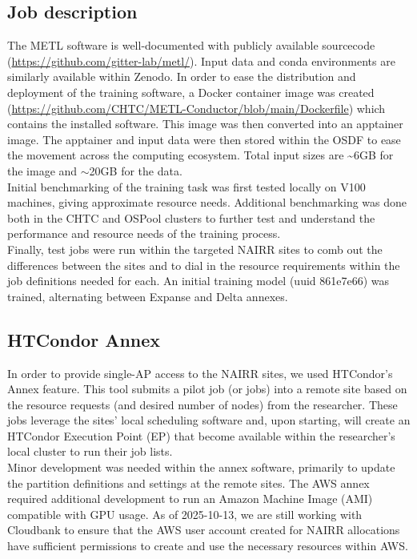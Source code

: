 \documentclass{article}
\begin{document}
\subsection{Job description}\label{job-description}

The METL software is well-documented with publicly available sourcecode
(\url{https://github.com/gitter-lab/metl/}). Input data and conda environments
are similarly available within Zenodo\cite{gelman_2025_14916528}. In order to
ease the distribution and deployment of the training software, a Docker
container image was created
(\url{https://github.com/CHTC/METL-Conductor/blob/main/Dockerfile}) which
contains the installed software. This image was then converted into an
apptainer\cite{apptainer} image. The apptainer and input data were then stored
within the OSDF to ease the movement across the computing ecosystem. Total input
sizes are \textasciitilde6GB for the image and $\sim$20GB for the data.\\
Initial benchmarking of the training task was first tested locally on V100
machines, giving approximate resource needs. Additional benchmarking was done
both in the CHTC and OSPool clusters to further test and understand the
performance and resource needs of the training process.\\ Finally, test jobs
were run within the targeted NAIRR sites to comb out the differences between the
sites and to dial in the resource requirements within the job definitions needed
for each. An initial training model (uuid 861e7e66) was trained, alternating
between Expanse and Delta annexes.

\subsection{HTCondor Annex}\label{htcondor-annex}

In order to provide single-AP access to the NAIRR sites, we used
HTCondor's Annex feature. This tool submits a pilot job (or jobs) into a
remote site based on the resource requests (and desired number of nodes)
from the researcher. These jobs leverage the sites' local scheduling
software and, upon starting, will create an HTCondor Execution Point
(EP) that become available within the researcher's local cluster to run
their job lists.\\
Minor development was needed within the annex software, primarily to update the
partition definitions and settings at the remote sites. The AWS annex required
additional development to run an Amazon Machine Image (AMI) compatible with GPU
usage. As of 2025-10-13, we are still working with Cloudbank to ensure that the
AWS user account created for NAIRR allocations have sufficient permissions to
create and use the necessary resources within AWS.
\end{document}
